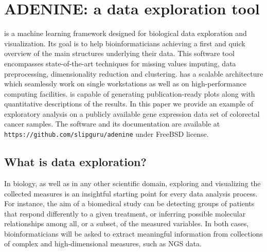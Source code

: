 
\chapter{ADENINE: a data exploration tool} \label{chap:adenine}

\ade is a machine learning framework designed for biological data exploration and visualization.
Its goal is to help bioinformaticians achieving a first and quick overview of the main structures underlying their data.
This software tool encompasses state-of-the-art techniques for missing values imputing, data preprocessing, dimensionality reduction and clustering.
\ade has a scalable architecture which seamlessly work on single workstations as well as on high-performance computing facilities.
\ade is capable of generating publication-ready plots along with quantitative descriptions of the results.
In this paper we provide an example of exploratory analysis on a publicly available gene expression data set of colorectal cancer samples.
The software and its documentation are available at  {\footnotesize \texttt{https://github.com/slipguru/adenine}} under FreeBSD license.

\section{What is data exploration?} \label{sec:data_exploration}

In biology, as well as in any other scientific domain, exploring and visualizing the collected measures is an insightful starting point for every data analysis process.
For instance, the aim of a biomedical study can be detecting groups of patients that respond differently to a given treatment, or inferring possible molecular relationships among all, or a subset, of the measured variables.
In both cases, bioinformaticians will be asked to extract meaningful information from collections of complex and high-dimensional measures, such as NGS data.

